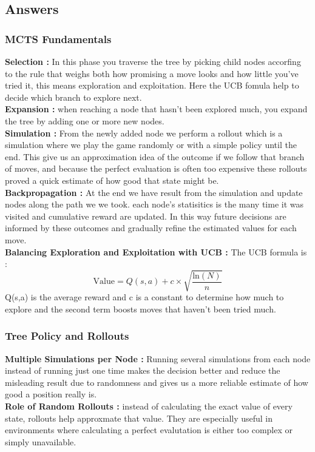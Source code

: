 \subsection{Answers}
\subsubsection{MCTS Fundamentals}
\textbf{Selection :} In this phase you traverse the tree by picking child nodes accorfing to the rule that weighs both how promising a move looks and how little you’ve tried it, this means exploration and exploitation. Here the UCB fomula help to decide which branch to explore next.\\
\textbf{Expansion :} when reaching a node that hasn't been explored much, you expand the tree by adding one or more new nodes.\\
\textbf{Simulation :} From the newly added node we perform a rollout which is a simulation where we play the game randomly or with a simple policy until the end. This give us an approximation idea of the outcome if we follow that branch of moves, and because the perfect evaluation is often too expensive these rollouts proved a quick estimate of how good that state might be.\\
\textbf{Backpropagation :} At the end we have result from the simulation and update nodes along the path we we took. each node's statisitics is the many time it was visited and cumulative reward are updated. In this way future decisions are informed by these outcomes and gradually refine the estimated values for each move.\\
\textbf{Balancing Exploration and Exploitation with UCB : }
The UCB formula is :
\[
\text{Value} = Q(s, a) + c \times \sqrt{\frac{\text{ln}(N)}{n}} 
\]
Q(s,a) is the average reward and c is a constant to determine how much to explore and the second term boosts moves that haven’t been tried much.

\subsubsection{Tree Policy and Rollouts}
\textbf{Multiple Simulations per Node :} Running several simulations from each node instead of running just one time makes the decision better and reduce the misleading result due to randomness and gives us a more reliable estimate of how good a position really is.\\
\textbf{Role of Random Rollouts :} instead of calculating the exact value of every state, rollouts help approxmate that value. They are especially useful in environments where calculating a perfect evalutation is either too complex or simply unavailable.

